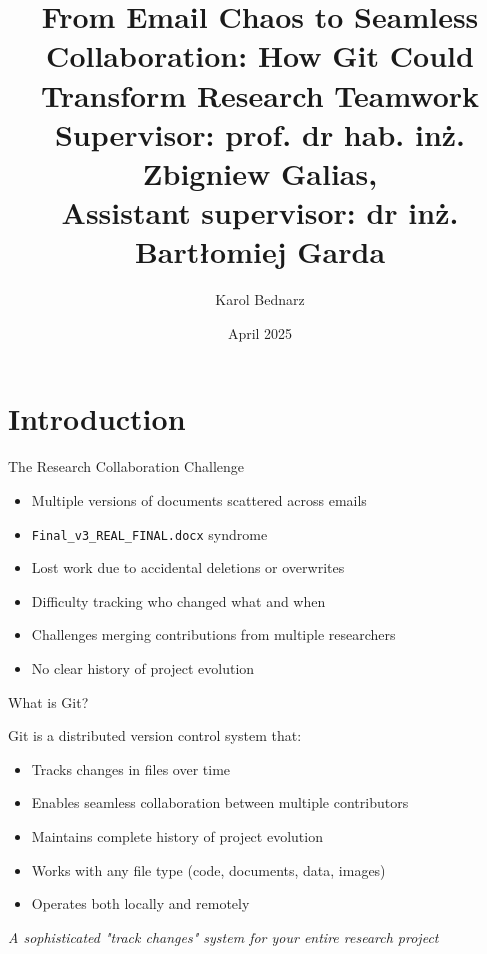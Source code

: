 \documentclass[aspectratio=1609]{beamer}
\title{From Email Chaos to Seamless Collaboration: How Git Could Transform Research Teamwork\\
\small Supervisor: prof. dr hab. inż. Zbigniew Galias, \\
Assistant supervisor: dr inż. Bartłomiej Garda
}
\date{April 2025}
\author{Karol Bednarz}
\begin{document}
\begin{frame}
\titlepage
\end{frame}


\section{Introduction}
\begin{frame}[fragile]{The Research Collaboration Challenge}
    \begin{tblock}{}
        \begin{itemize}
            \item Multiple versions of documents scattered across emails
            \item \verb|Final_v3_REAL_FINAL.docx| syndrome
            \item Lost work due to accidental deletions or overwrites
            \item Difficulty tracking who changed what and when
            \item Challenges merging contributions from multiple researchers
            \item No clear history of project evolution
        \end{itemize}
    \end{tblock}
\end{frame}

\begin{frame}{What is Git?}
    \begin{tblock}{Git is a distributed version control system that:}
        \begin{itemize}
            \item Tracks changes in files over time
            \item Enables seamless collaboration between multiple contributors
            \item Maintains complete history of project evolution
            \item Works with any file type (code, documents, data, images)
            \item Operates both locally and remotely
        \end{itemize}
    \end{tblock}
    \begin{talert}{}
        \emph{A sophisticated "track changes" system for your entire research project}
    \end{talert}
\end{frame}
\end{document}
